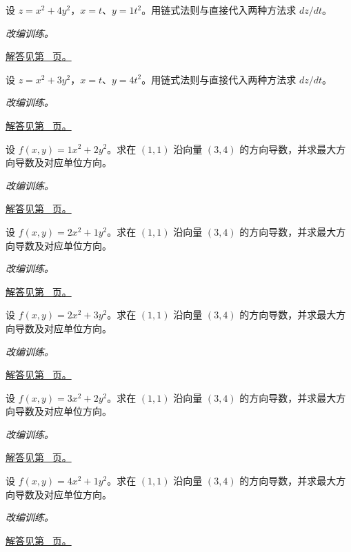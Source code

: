 \documentclass[UTF8,12pt,a4paper,fontset=fandol]{ctexart}
\begin{document}
\begin{example}[复合函数的两种求导路径]\label{ex:c34q6}
设 $z=x^2+4y^2$，$x=t$、$y=1t^2$。用链式法则与直接代入两种方法求 $dz/dt$。
\par\textit{改编训练。}\par\hyperref[ans:c34q6]{解答见第~\pageref{ans:c34q6} 页。}
\end{example}
\begin{example}[复合函数的两种求导路径]\label{ex:c34q7}
设 $z=x^2+3y^2$，$x=t$、$y=4t^2$。用链式法则与直接代入两种方法求 $dz/dt$。
\par\textit{改编训练。}\par\hyperref[ans:c34q7]{解答见第~\pageref{ans:c34q7} 页。}
\end{example}
\begin{example}[梯度与最陡方向]\label{ex:c34q8}
设 $f(x,y)=1x^2+2y^2$。求在 $(1,1)$ 沿向量 $(3,4)$ 的方向导数，并求最大方向导数及对应单位方向。
\par\textit{改编训练。}\par\hyperref[ans:c34q8]{解答见第~\pageref{ans:c34q8} 页。}
\end{example}
\begin{example}[梯度与最陡方向]\label{ex:c34q9}
设 $f(x,y)=2x^2+1y^2$。求在 $(1,1)$ 沿向量 $(3,4)$ 的方向导数，并求最大方向导数及对应单位方向。
\par\textit{改编训练。}\par\hyperref[ans:c34q9]{解答见第~\pageref{ans:c34q9} 页。}
\end{example}
\begin{example}[梯度与最陡方向]\label{ex:c34q10}
设 $f(x,y)=2x^2+3y^2$。求在 $(1,1)$ 沿向量 $(3,4)$ 的方向导数，并求最大方向导数及对应单位方向。
\par\textit{改编训练。}\par\hyperref[ans:c34q10]{解答见第~\pageref{ans:c34q10} 页。}
\end{example}
\begin{example}[梯度与最陡方向]\label{ex:c34q11}
设 $f(x,y)=3x^2+2y^2$。求在 $(1,1)$ 沿向量 $(3,4)$ 的方向导数，并求最大方向导数及对应单位方向。
\par\textit{改编训练。}\par\hyperref[ans:c34q11]{解答见第~\pageref{ans:c34q11} 页。}
\end{example}
\begin{example}[梯度与最陡方向]\label{ex:c34q12}
设 $f(x,y)=4x^2+1y^2$。求在 $(1,1)$ 沿向量 $(3,4)$ 的方向导数，并求最大方向导数及对应单位方向。
\par\textit{改编训练。}\par\hyperref[ans:c34q12]{解答见第~\pageref{ans:c34q12} 页。}
\end{example}
\end{document}
